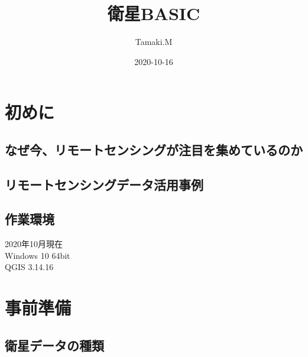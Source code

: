 \documentclass[
]{book}
\title{衛星BASIC}
\author{Tamaki.M}
\date{2020-10-16}
\begin{document}
\maketitle

{
\setcounter{tocdepth}{1}
\tableofcontents
}
\hypertarget{ux521dux3081ux306b}{%
\chapter*{初めに}\label{ux521dux3081ux306b}}

\hypertarget{ux306aux305cux4ecaux30eaux30e2ux30fcux30c8ux30bbux30f3ux30b7ux30f3ux30b0ux304cux6ce8ux76eeux3092ux96c6ux3081ux3066ux3044ux308bux306eux304b}{%
\section{なぜ今、リモートセンシングが注目を集めているのか}\label{ux306aux305cux4ecaux30eaux30e2ux30fcux30c8ux30bbux30f3ux30b7ux30f3ux30b0ux304cux6ce8ux76eeux3092ux96c6ux3081ux3066ux3044ux308bux306eux304b}}

\hypertarget{ux30eaux30e2ux30fcux30c8ux30bbux30f3ux30b7ux30f3ux30b0ux30c7ux30fcux30bfux6d3bux7528ux4e8bux4f8b}{%
\section{リモートセンシングデータ活用事例}\label{ux30eaux30e2ux30fcux30c8ux30bbux30f3ux30b7ux30f3ux30b0ux30c7ux30fcux30bfux6d3bux7528ux4e8bux4f8b}}

\hypertarget{ux4f5cux696dux74b0ux5883}{%
\section{作業環境}\label{ux4f5cux696dux74b0ux5883}}

2020年10月現在\\
Windows 10 64bit\\
QGIS 3.14.16

\hypertarget{ux4e8bux524dux6e96ux5099}{%
\chapter{事前準備}\label{ux4e8bux524dux6e96ux5099}}

\hypertarget{ux885bux661fux30c7ux30fcux30bfux306eux7a2eux985e}{%
\section{衛星データの種類}\label{ux885bux661fux30c7ux30fcux30bfux306eux7a2eux985e}}
\end{document}
